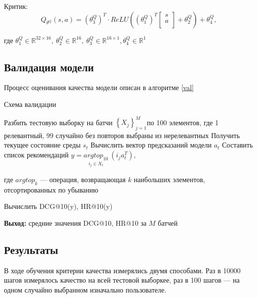 \documentclass[14pt]{extarticle}
\begin{document}
Критик: $$Q_{\theta^{Q}}(s, a) = \left(\theta^{Q}_3\right)^T \cdot ReLU\left(\left(\theta^{Q}_1\right)^T \left[\begin{array}{c} 
s \\ a \\ 
\end{array}\right] + \theta^{Q}_2\right) + \theta^{Q}_4,$$

где $\theta^{Q}_1 \in \mathbb{R}^{32\times 16},\ \theta^{Q}_2 \in \mathbb{R}^{16},\ \theta^{Q}_3 \in \mathbb{R}^{16\times1}, \theta^{Q}_4 \in \mathbb{R}^1$

\subsection{Валидация модели}

Процесс оценивания качества модели описан в алгоритме \ref{val}

\begin{algorithm}[H]
\caption{{Схема валидации}}
\label{val}

\begin{algorithmic}[1]
\STATE Разбить тестовую выборку на батчи $\left\{X_j\right\}_{j=1}^M$по 100 элементов, где 1 релевантный, 99 случайно без повторов выбраны из нерелевантных 
\STATE Получить текущее состояние среды $s_t$
\STATE Вычислить вектор предсказаний модели $a_t$
\STATE Составить список рекомендаций $y = \underset{i_j\in X_t}{argtop_{10}}\ \left(i_j a_t^T\right)$, 

где $argtop_k$ --- операция, возвращающая $k$ наибольших элементов, отсортированных по убыванию

\STATE Вычислить DCG@10(y), HR@10(y)
\ENDFOR

\hspace*{\algorithmicindent} \textbf{Выход:} средние значения DCG@10, HR@10 за $M$ батчей 
\end{algorithmic}
\end{algorithm}

\subsection{Результаты}

В ходе обучения критерии качества измерялись двумя способами. 
Раз в 10000 шагов измерялось качество на всей тестовой выборкее, раз в 100 шагов --- на одном случайно выбранном изначально пользователе.
\end{document}
